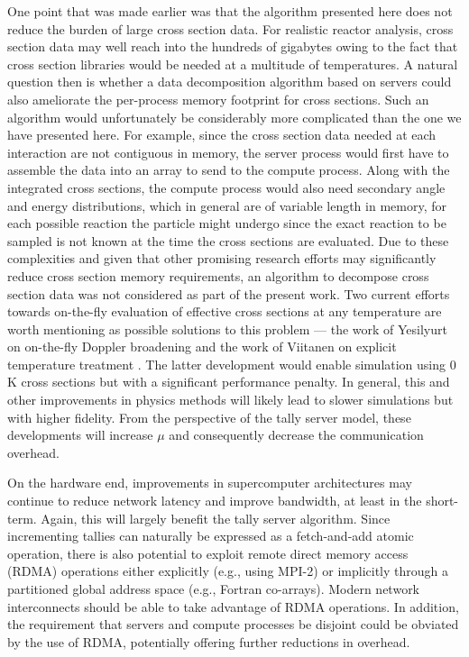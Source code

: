 \documentclass[3p,fleqn]{elsarticle}
\begin{document}
One point that was made earlier was that the algorithm presented here does not
reduce the burden of large cross section data. For realistic reactor analysis,
cross section data may well reach into the hundreds of gigabytes owing to the
fact that cross section libraries would be needed at a multitude of
temperatures. A natural question then is whether a data decomposition algorithm
based on servers could also ameliorate the per-process memory footprint for
cross sections. Such an algorithm would unfortunately be considerably more
complicated than the one we have presented here. For example, since the cross
section data needed at each interaction are not contiguous in memory, the server
process would first have to assemble the data into an array to send to the
compute process. Along with the integrated cross sections, the compute process
would also need secondary angle and energy distributions, which in general are
of variable length in memory, for each possible reaction the particle might
undergo since the exact reaction to be sampled is not known at the time the
cross sections are evaluated. Due to these complexities and given that other
promising research efforts may significantly reduce cross section memory
requirements, an algorithm to decompose cross section data was not considered as
part of the present work. Two current efforts towards on-the-fly evaluation of
effective cross sections at any temperature are worth mentioning as possible
solutions to this problem --- the work of Yesilyurt on on-the-fly Doppler
broadening \cite{nse-yesilyurt-2012} and the work of Viitanen on explicit
temperature treatment \cite{nse-viitanen-2012}. The latter development would
enable simulation using 0 K cross sections but with a significant performance
penalty. In general, this and other improvements in physics methods will likely
lead to slower simulations but with higher fidelity. From the perspective of the
tally server model, these developments will increase $\mu$ and consequently
decrease the communication overhead.

On the hardware end, improvements in supercomputer architectures may continue to
reduce network latency and improve bandwidth, at least in the short-term. Again,
this will largely benefit the tally server algorithm. Since incrementing tallies
can naturally be expressed as a fetch-and-add atomic operation, there is also
potential to exploit remote direct memory access (RDMA) operations either
explicitly (e.g., using MPI-2) or implicitly through a partitioned global
address space (e.g., Fortran co-arrays). Modern network interconnects should be
able to take advantage of RDMA operations. In addition, the requirement that
servers and compute processes be disjoint could be obviated by the use of RDMA,
potentially offering further reductions in overhead.
\end{document}
